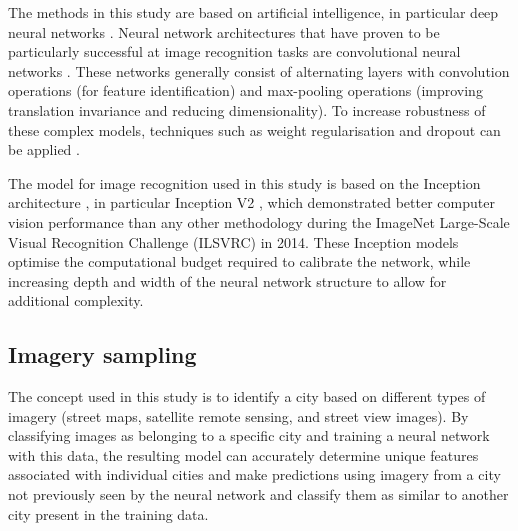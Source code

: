 \documentclass[10pt,letterpaper]{article}
\begin{document}
The methods in this study are based on artificial intelligence, in particular deep neural networks \cite{Bishop1995,Samarasinghe2016,Graupe2013}. Neural network architectures that have proven to be particularly successful at image recognition tasks are convolutional neural networks \cite{Schmidhuber2015}. These networks generally consist of alternating layers with convolution operations (for feature identification) and max-pooling operations (improving translation invariance and reducing dimensionality). To increase robustness of these complex models, techniques such as weight regularisation and dropout can be applied \cite{Srivastava2014}.

The model for image recognition used in this study is based on the Inception architecture \cite{Szegedy2015}, in particular Inception V2 \cite{Ioffe2015}, which demonstrated better computer vision performance than any other methodology during the ImageNet Large-Scale Visual Recognition Challenge (ILSVRC) \cite{Russakovsky2015} in 2014. These Inception models optimise the computational budget required to calibrate the network, while increasing depth and width of the neural network structure to allow for additional complexity.


\subsection*{Imagery sampling}\label{sec:methods2}

The concept used in this study is to identify a city based on different types of imagery (street maps, satellite remote sensing, and street view images). By classifying images as belonging to a specific city and training a neural network with this data, the resulting model can accurately determine unique features associated with individual cities and make predictions using imagery from a city not previously seen by the neural network and classify them as similar to another city present in the training data.
\end{document}
